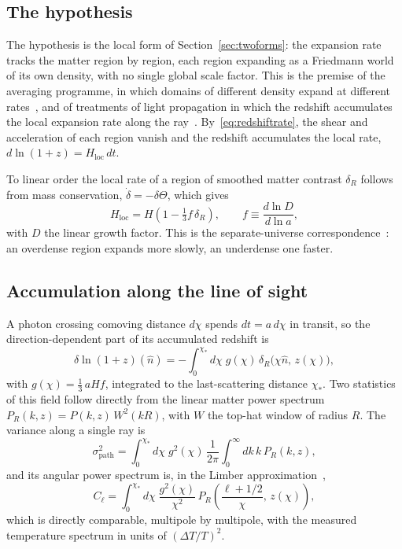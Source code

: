\documentclass[twocolumn]{aastex701}
\begin{document}
\subsection{The hypothesis}

The hypothesis is the local form of Section~\ref{sec:twoforms}: the expansion rate tracks the matter region by region, each region expanding as a Friedmann world of its own density, with no single global scale factor. This is the premise of the averaging programme, in which domains of different density expand at different rates~\citep{Buchert2000}, and of treatments of light propagation in which the redshift accumulates the local expansion rate along the ray~\citep{Rasanen2009}. By~\eqref{eq:redshiftrate}, the shear and acceleration of each region vanish and the redshift accumulates the local rate, $d\ln(1+z)=H_{\mathrm{loc}}\,dt$.

To linear order the local rate of a region of smoothed matter contrast $\delta_R$ follows from mass conservation, $\dot\delta=-\delta\Theta$, which gives
\begin{equation}
H_{\mathrm{loc}} = H\left(1-\tfrac13 f\,\delta_R\right),\qquad f\equiv\frac{d\ln D}{d\ln a},
\label{eq:localrate}
\end{equation}
with $D$ the linear growth factor. This is the separate-universe correspondence~\citep{Peebles1980}: an overdense region expands more slowly, an underdense one faster.

\subsection{Accumulation along the line of sight}

A photon crossing comoving distance $d\chi$ spends $dt=a\,d\chi$ in transit, so the direction-dependent part of its accumulated redshift is
\begin{equation}
\delta\ln(1+z)(\hat n) = -\int_0^{\chi_*} d\chi\; g(\chi)\,\delta_R\big(\chi\hat n,\,z(\chi)\big),
\label{eq:lineint}
\end{equation}
with $g(\chi)=\tfrac13\,aHf$, integrated to the last-scattering distance $\chi_*$. Two statistics of this field follow directly from the linear matter power spectrum $P_R(k,z)=P(k,z)\,W^{2}(kR)$, with $W$ the top-hat window of radius $R$. The variance along a single ray is
\begin{equation}
\sigma^{2}_{\mathrm{path}} = \int_0^{\chi_*} d\chi\; g^{2}(\chi)\,\frac{1}{2\pi}\int_0^\infty dk\,k\,P_R(k,z),
\label{eq:sigmapath}
\end{equation}
and its angular power spectrum is, in the Limber approximation~\citep{Limber1953},
\begin{equation}
C_\ell = \int_0^{\chi_*} d\chi\;\frac{g^{2}(\chi)}{\chi^{2}}\,P_R\!\left(\frac{\ell+1/2}{\chi},\,z(\chi)\right),
\label{eq:limber}
\end{equation}
which is directly comparable, multipole by multipole, with the measured temperature spectrum in units of $(\Delta T/T)^2$.
\end{document}
